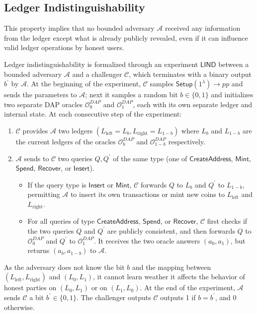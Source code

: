 \documentclass{llncs}
\newcommand{\func}[1]{\mathsf{#1}}
\begin{document}
\subsection{Ledger Indistinguishability}

This property implies that no bounded adversary $\mathcal{A}$ received any information from the ledger except what is already publicly revealed, even if it can influence valid ledger operations by honest users.

Ledger indistinguishability is formalized through an experiment $\func{LIND}$ between a bounded adversary $\mathcal{A}$ and a challenger $\mathcal{C}$, which terminates with a binary output $b^{\prime}$ by $\mathcal{A}$.
At the beginning of the experiment, $\mathcal{C}$ samples $\func{Setup}(1^\lambda) \to pp$ and sends the parameters to $\mathcal{A}$; next it samples a random bit $b \in \lbrace 0,1 \rbrace$ and initializes two separate DAP oracles $\mathcal{O}_0^{DAP}$ and $\mathcal{O}_1^{DAP}$, each with its own separate ledger and internal state.
At each consecutive step of the experiment:
\begin{enumerate}
\item $\mathcal{C}$ provides $\mathcal{A}$ two ledgers $(L_{\text{left}} = L_b, L_{\text{right}} = L_{1-b})$ where $L_b$ and $L_{1-b}$ are the current ledgers of the oracles $\mathcal{O}_b^{DAP}$ and $\mathcal{O}_{1-b}^{DAP}$ respectively. 
\item $\mathcal{A}$ sends to $\mathcal{C}$ two queries $Q, Q^{\prime}$ of the same type (one of $\func{CreateAddress}$, $\func{Mint}$, $\func{Spend}$, $\func{Recover}$, or $\func{Insert}$). 
\begin{itemize}
    \item If the query type is $\func{Insert}$ or $\func{Mint}$, $\mathcal{C}$ forwards $Q$ to $L_{b}$ and $Q^\prime$ to $L_{1-b}$, permitting $\mathcal{A}$ to insert its own transactions or mint new coins to $L_{\text{left}}$ and $L_{\text{right}}$.
    \item For all queries of type $\func{CreateAddress}$, $\func{Spend}$, or $\func{Recover}$, $\mathcal{C}$ first checks if the two queries $Q$ and $Q^\prime$ are publicly consistent, and then forwards $Q$ to $\mathcal{O}_0^{DAP}$ and $Q^\prime$ to $\mathcal{O}_1^{DAP}$.
    It receives the two oracle answers $(a_0,a_1)$, but returns $(a_b,a_{1-b})$ to $\mathcal{A}$.
\end{itemize}
\end{enumerate}
As the adversary does not know the bit $b$ and the mapping between $(L_{\text{left}}, L_{\text{right}})$ and $(L_0, L_1)$, it cannot learn weather it affects the behavior of honest parties on $(L_0, L_1)$ or on $(L_1, L_0)$.
At the end of the experiment, $\mathcal{A}$ sends $\mathcal{C}$ a bit $b^\prime \in \lbrace 0,1 \rbrace$.
The challenger outputs $\mathcal{C}$ outputs 1 if $b = b^\prime$, and 0 otherwise.
\end{document}
